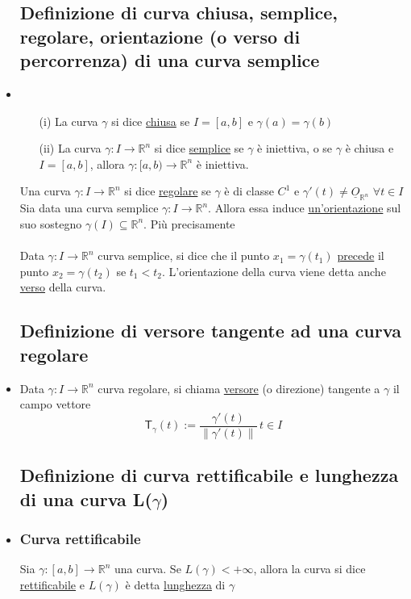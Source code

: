 \documentclass{report}
\newcommand{\ace}{\`e }
\newcommand{\acu}{\`u }
\newcommand{\Ins}[1]{\mathbb{#1}}
\newcommand{\R}{\Ins{R}}
\newcommand{\norma}[1]{\left\lVert#1\right\rVert}
\newcommand{\origine}{\underline{O}}
\newcommand{\T}{\mathsf{T}}
\newcommand{\g}{\gamma}
\begin{document}
\begin{itemize}
  \subsection{Definizione di curva chiusa, semplice, regolare, orientazione (o verso di percorrenza) di una curva semplice}
  \item \begin{itemize}
          \item[(i)] La curva $\gamma$ si dice \underline{chiusa} se $I = [a,b]$ e $\gamma(a) = \gamma(b)$
          \item[(ii)] La curva $\gamma:I\to\R^n$ si dice \underline{semplice} se $\gamma$ \ace iniettiva, o 
                      se $\gamma$ \ace chiusa e $I = [a,b]$, allora $\gamma :[a,b) \to \R^n$ \ace iniettiva.
        \end{itemize}
        Una curva $\gamma:I\to\R^n$ si dice \underline{regolare} se $\gamma$ 
        \ace di classe $C^1$ e $\gamma'(t) \neq \origine_{\R^n}$ $\forall t \in I$ 
        Sia data una curva semplice $\gamma:I\to\R^n$. Allora 
        essa induce \underline{un'orientazione} sul suo sostegno $\gamma(I) \subseteq \R^n$.
        Pi\acu precisamente \\\\
        Data $\gamma:I\to\R^n$ curva semplice, si dice che il punto $x_1 = \gamma(t_1)$ \underline{precede}
        il punto $x_2 = \gamma(t_2)$ se $t_1 < t_2$. L'orientazione della curva viene detta
        anche \underline{verso} della curva.

  \subsection{Definizione di versore tangente ad una curva regolare}
  \item Data $\gamma : I \to \R^n$ curva regolare, si chiama \underline{versore} (o direzione) tangente a $\gamma$
        il campo vettore $$\T_{\gamma} (t) := \frac{\gamma'(t)}{\norma{\gamma'(t)}} \, t \in I$$

  \subsection{Definizione di curva rettificabile e lunghezza di una curva L($\g$)}
  \item \subsubsection{Curva rettificabile}
          Sia $\g:[a,b]\to\R^n$ una curva. Se $L(\g) < +\infty$, allora la curva si dice
          \underline{rettificabile} e $L(\g)$ \ace detta \underline{lunghezza} di $\g$


\end{itemize}
\end{document}

